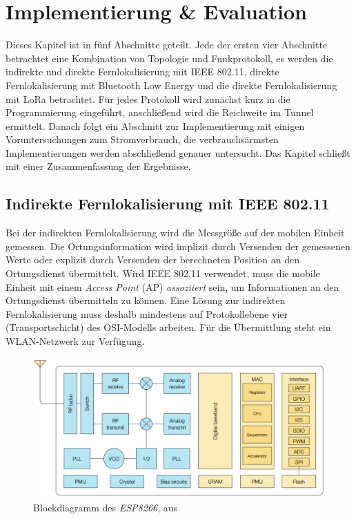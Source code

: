 \chapter{Implementierung \& Evaluation}
\label{ch:Implementierung}
Dieses Kapitel ist in fünf Abschnitte geteilt. 
Jede der ersten vier Abschnitte betrachtet eine Kombination von Topologie und Funkprotokoll, es werden die indirekte und direkte Fernlokalisierung mit IEEE 802.11, direkte Fernlokalisierung mit Bluetooth Low Energy und die direkte Fernlokalisierung mit LoRa betrachtet.
Für jedes Protokoll wird zunächst kurz in die Programmierung eingeführt, anschließend wird die Reichweite im Tunnel ermittelt. %
Danach folgt ein Abschnitt zur Implementierung mit einigen Voruntersuchungen zum Stromverbrauch, die verbrauchsärmsten Implementierungen werden abschließend genauer untersucht.
Das Kapitel schließt mit einer Zusammenfassung der Ergebnisse.

\section{Indirekte Fernlokalisierung mit IEEE 802.11}
\label{ch:phase1}
Bei der indirekten Fernlokalisierung wird die Messgröße auf der mobilen Einheit gemessen.
Die Ortungsinformation wird implizit durch Versenden der gemessenen Werte oder explizit durch Versenden der berechneten Position an den Ortungsdienst übermittelt.
Wird IEEE 802.11 verwendet, muss die mobile Einheit mit einem \emph{Access Point} (AP) \emph{assoziiert} sein, um Informationen an den Ortungsdienst übermitteln zu können.
Eine Lösung zur indirekten Fernlokalisierung muss deshalb mindestens auf Protokollebene vier (Transportschicht) des OSI-Modells arbeiten.
Für die Übermittlung steht ein WLAN-Netzwerk zur Verfügung.

\begin{figure}[h]
  \centering
	\includegraphics[width=\textwidth]{images/espblock.png}
  \caption{Blockdiagramm des \emph{ESP8266}, aus \cite{espressif2017esp8266}}
  \label{fig:espblock}
\end{figure}

